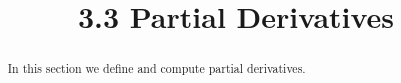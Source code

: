 \documentclass[handout]{ximera}
\title{3.3 Partial Derivatives}
\begin{document}
\begin{abstract}
In this section we define and compute partial derivatives.
\end{abstract}

\maketitle
\end{document}
